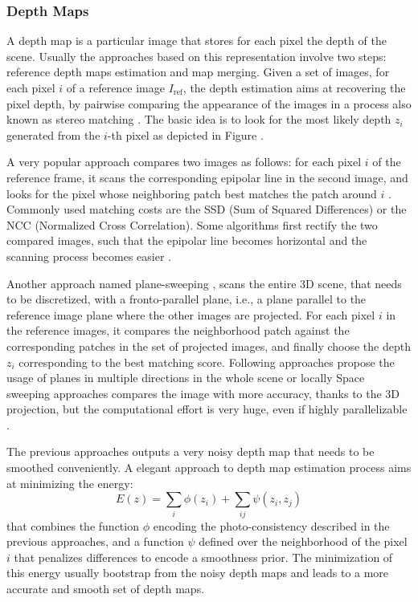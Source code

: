 \subsubsection{Depth Maps}
A depth map is a particular image that stores for each pixel the depth of the scene.
Usually the approaches based on this representation involve two steps: reference depth maps estimation and map merging.
Given a set of images, for each pixel $i$ of a reference image $I_{\text{ref}}$, the depth estimation aims at recovering the pixel depth, by pairwise comparing the appearance of the images in a process also known as stereo matching \cite{scharstein2002taxonomy}. 
The basic idea is to look for the most likely depth $z_i$ generated from the $i$-th pixel as depicted in Figure .

A very popular approach compares two images as follows: for each pixel $i$ of the reference frame, it scans the corresponding epipolar line in the second image, and looks for the pixel whose neighboring patch best matches the patch around $i$  \cite{lhuillier2002match}. 
Commonly used matching costs are the SSD (Sum of Squared Differences) or the NCC (Normalized Cross Correlation).
Some algorithms first rectify the two compared images, such that the epipolar line becomes horizontal and the scanning process becomes easier 
\cite{kang2001handling,bradley2008accurate,moons20093d}. 

Another approach named plane-sweeping \cite{collins1996space}, scans the entire 3D scene, that needs to be discretized, with a fronto-parallel plane, i.e., a plane parallel to the reference image plane where the other images are projected. For each pixel $i$ in the reference images, it compares the neighborhood patch against the corresponding patches in the set of projected images, and finally choose the depth $z_i$ corresponding to the best matching score. 
Following approaches propose the usage of planes in multiple directions in the whole scene \cite{gallup2007real} or locally \cite{sinha2014efficient}
Space sweeping approaches compares the image with more accuracy, thanks to the 3D projection, but the computational effort is very huge, even if highly parallelizable \cite{yang2003multi}.

The previous approaches outputs a very noisy depth map that needs to be smoothed conveniently. 
A elegant approach to depth map estimation process aims at minimizing the energy:
\begin{equation}
 \label{eq:depthenergy} 
 E(z) = \sum_i \phi(z_i)  + \sum_{ij} \psi(z_i,z_j)
\end{equation}
that combines the function $\phi$ encoding the photo-consistency described in the previous approaches, and a function $\psi$ defined over the neighborhood of the pixel $i$ that penalizes differences to encode a smoothness prior. The minimization of this energy usually bootstrap from the noisy depth maps and leads to a more accurate and smooth set of depth maps.

